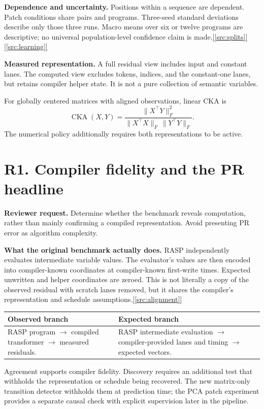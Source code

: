 \documentclass[10pt,a4paper]{article}
\newcommand{\newsection}[1]{\clearpage\section{#1}}
\newcommand{\request}[1]{\begingroup\color{muted}\textbf{Reviewer request.} #1\par\endgroup}
\newcommand{\ev}[1]{\hyperref[src:#1]{[\ref*{src:#1}]}}
\begin{document}
\textbf{Dependence and uncertainty.} Positions within a sequence are dependent. Patch conditions share pairs and programs. Three-seed standard deviations describe only those three runs. Macro means over six or twelve programs are descriptive; no universal population-level confidence claim is made.\ev{splits}\ev{learning}

\textbf{Measured representation.} A full residual view includes input and constant lanes. The computed view excludes tokens, indices, and the constant-one lanes, but retains compiler helper state. It is not a pure collection of semantic variables.

For globally centered matrices with aligned observations, linear CKA is
\[
\operatorname{CKA}(X,Y)=\frac{\|X^\top Y\|_F^2}{\|X^\top X\|_F\,\|Y^\top Y\|_F}.
\]
The numerical policy additionally requires both representations to be active.

\newsection{R1. Compiler fidelity and the PR headline}
\request{Determine whether the benchmark reveals computation, rather than mainly confirming a compiled representation. Avoid presenting PR error as algorithm complexity.}
\textbf{What the original benchmark actually does.} RASP independently evaluates intermediate variable values. The evaluator's values are then encoded into compiler-known coordinates at compiler-known first-write times. Expected unwritten and helper coordinates are zeroed. This is not literally a copy of the observed residual with scratch lanes removed, but it shares the compiler's representation and schedule assumptions.\ev{alignment}

\begin{center}\small
\begin{tabularx}{\linewidth}{@{}XX@{}}
\toprule
Observed branch & Expected branch\\
\midrule
RASP program $\rightarrow$ compiled transformer $\rightarrow$ measured residuals. & RASP intermediate evaluation $\rightarrow$ compiler-provided lanes and timing $\rightarrow$ expected vectors.\\
\bottomrule
\end{tabularx}
\end{center}

Agreement supports compiler fidelity. Discovery requires an additional test that withholds the representation or schedule being recovered. The new matrix-only transition detector withholds them at prediction time; the PCA patch experiment provides a separate causal check with explicit supervision later in the pipeline.
\end{document}
